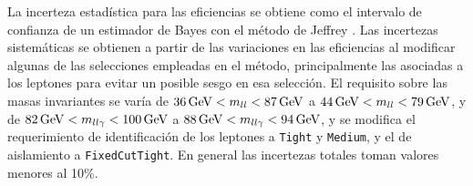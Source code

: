 La incerteza estadística para las eficiencias se obtiene como el intervalo de confianza de un estimador de Bayes con el método de Jeffrey \cite{Casadei_2012}.
Las incertezas sistemáticas se obtienen a partir de las variaciones en las eficiencias al modificar algunas de las selecciones empleadas en el método, principalmente las asociadas a los leptones para evitar un posible sesgo en esa selección. El requisito sobre las masas invariantes se varía de $36\,\text{GeV}<m_{ll}<87\,\text{GeV}$ a $44\,\text{GeV}<m_{ll}<79\,\text{GeV}$, y de 
$82\,\text{GeV}<m_{ll\gamma}<100\,\text{GeV}$ a $88\,\text{GeV}<m_{ll\gamma}<94\,\text{GeV}$, y se modifica el requerimiento de identificación de los leptones a \texttt{Tight} y \texttt{Medium}, y el de aislamiento a \texttt{FixedCutTight}. En general las incertezas totales toman valores menores al 10\%.





